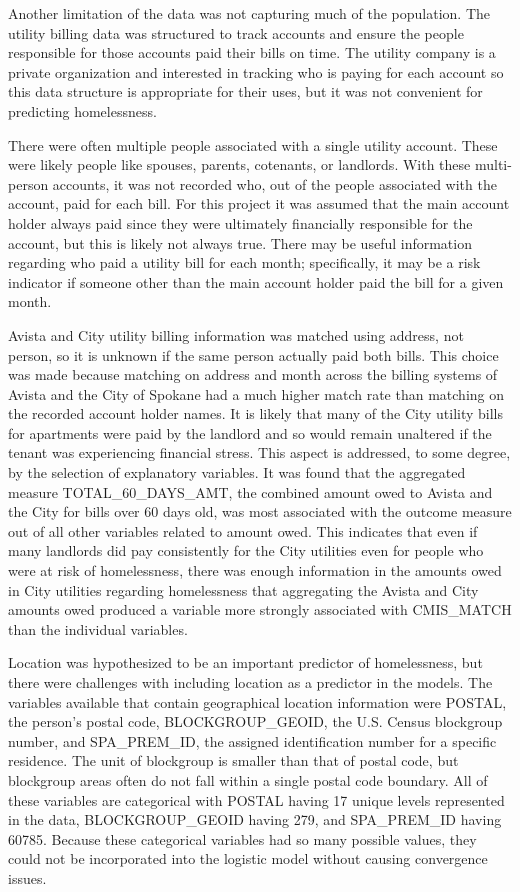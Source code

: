\documentclass[10pt,letterpaper]{article}
\begin{document}
Another limitation of the data was not capturing much of the population. The utility billing data was structured to track accounts and ensure the people responsible for those accounts paid their bills on time. The utility company is a private organization and interested in tracking who is paying for each account so this data structure is appropriate for their uses, but it was not convenient for predicting homelessness.

There were often multiple people associated with a single utility account. These were likely people like spouses, parents, cotenants, or landlords. With these multi-person accounts, it was not recorded who, out of the people associated with the account, paid for each bill. For this project it was assumed that the main account holder always paid since they were ultimately financially responsible for the account, but this is likely not always true. There may be useful information regarding who paid a utility bill for each month; specifically, it may be a risk indicator if someone other than the main account holder paid the bill for a given month.

Avista and City utility billing information was matched using address, not person, so it is unknown if the same person actually paid both bills. This choice was made because matching on address and month across the billing systems of Avista and the City of Spokane had a much higher match rate than matching on the recorded account holder names. It is likely that many of the City utility bills for apartments were paid by the landlord and so would remain unaltered if the tenant was experiencing financial stress. This aspect is addressed, to some degree, by the selection of explanatory variables. It was found that the aggregated measure TOTAL\_60\_DAYS\_AMT, the combined amount owed to Avista and the City for bills over 60 days old, was most associated with the outcome measure out of all other variables related to amount owed. This indicates that even if many landlords did pay consistently for the City utilities even for people who were at risk of homelessness, there was enough information in the amounts owed in City utilities regarding homelessness that aggregating the Avista and City amounts owed produced a variable more strongly associated with CMIS\_MATCH than the individual variables.

Location was hypothesized to be an important predictor of homelessness, but there were challenges with including location as a predictor in the models. The variables available that contain geographical location information were POSTAL, the person's postal code, BLOCKGROUP\_GEOID, the U.S. Census blockgroup number, and SPA\_PREM\_ID, the assigned identification number for a specific residence. The unit of blockgroup is smaller than that of postal code, but blockgroup areas often do not fall within a single postal code boundary. All of these variables are categorical with POSTAL having 17 unique levels represented in the data, BLOCKGROUP\_GEOID having 279, and SPA\_PREM\_ID having 60785. Because these categorical variables had so many possible values, they could not be incorporated into the logistic model without causing convergence issues.
\end{document}
